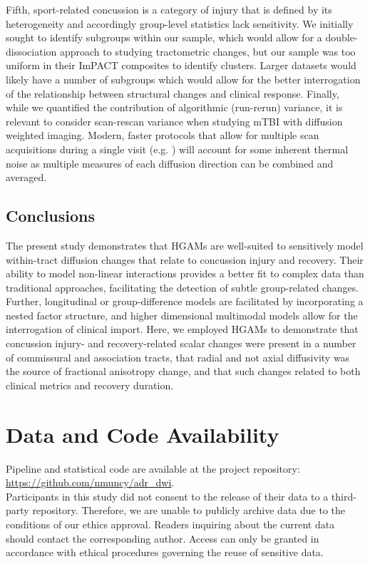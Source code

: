 \documentclass[]{imag-ms-template}
\begin{document}
Fifth, sport-related concussion is a category of injury that is defined by its heterogeneity and accordingly group-level statistics lack sensitivity. We initially sought to identify subgroups within our sample, which would allow for a double-dissociation approach to studying tractometric changes, but our sample was too uniform in their ImPACT composites to identify clusters. Larger datasets would likely have a number of subgroups which would allow for the better interrogation of the relationship between structural changes and clinical response. Finally, while we quantified the contribution of algorithmic (run-rerun) variance, it is relevant to consider scan-rescan variance when studying mTBI with diffusion weighted imaging. Modern, faster protocols that allow for multiple scan acquisitions during a single visit (e.g. \cite{li2020EvaluationMultishellDiffusion}) will account for some inherent thermal noise as multiple measures of each diffusion direction can be combined and averaged.


\subsection{Conclusions}
\label{ssec:disc-conc}
The present study demonstrates that HGAMs are well-suited to sensitively model within-tract diffusion changes that relate to concussion injury and recovery. Their ability to model non-linear interactions provides a better fit to complex data than traditional approaches, facilitating the detection of subtle group-related changes. Further, longitudinal or group-difference models are facilitated by incorporating a nested factor structure, and higher dimensional multimodal models allow for the interrogation of clinical import. Here, we employed HGAMs to demonstrate that concussion injury- and recovery-related scalar changes were present in a number of commissural and association tracts, that radial and not axial diffusivity was the source of fractional anisotropy change, and that such changes related to both clinical metrics and recovery duration.


\section*{Data and Code Availability}
\label{sec:xtr-dca}
Pipeline and statistical code are available at the project repository: \url{https://github.com/nmuncy/adr_dwi}.\\

\noindent Participants in this study did not consent to the release of their data to a third-party repository. Therefore, we are unable to publicly archive data due to the conditions of our ethics approval. Readers inquiring about the current data should contact the corresponding author. Access can only be granted in accordance with ethical procedures governing the reuse of sensitive data.
\end{document}

